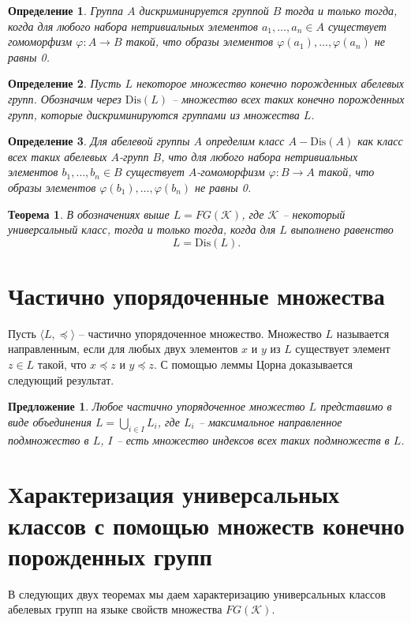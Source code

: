 \documentclass[12pt]{extarticle} %
\newtheorem{theorem}{Теорема}[section]
\newtheorem{proposition}{Предложение}[section]
\newtheorem{definition}{Определение}[section]
\def\K{{\mathcal{K}}}
\def\Dis{{\mathrm{Dis}}}
\begin{document}
\begin{definition}
Группа $A$ дискриминируется группой $B$ тогда и только тогда, когда для любого набора нетривиальных элементов $a_1, \ldots, a_n \in A$ существует гомоморфизм $\varphi : A \rightarrow B$ такой, что образы элементов $\varphi(a_1), \ldots, \varphi(a_n)$ не равны 0.
\end{definition}

\begin{definition}
Пусть $L$ некоторое множество конечно порожденных абелевых групп. Обозначим через $\Dis(L)$ -- множество всех таких конечно порожденных групп, которые дискриминируются группами из множества $L$.
\end{definition}

\begin{definition}
Для абелевой группы $A$ определим класс $A-\Dis(A)$ как класс всех таких абелевых $A$-групп $B$, что для любого набора нетривиальных элементов $b_1, \ldots, b_n \in B$ существует $A$-гомоморфизм $\varphi: B \rightarrow A$ такой, что образы элементов $\varphi(b_1), \ldots, \varphi(b_n)$ не равны 0.
\end{definition}


\begin{theorem}\label{th:LDisL}
В обозначениях выше $L = FG(\K)$, где $\K$ -- некоторый универсальный класс, тогда и только тогда, когда для $L$ выполнено равенство $$L = \Dis(L).$$
\end{theorem}


\section{Частично упорядоченные множества} 
Пусть $\langle L, \preceq \rangle$ -- частично упорядоченное множество. Множество $L$ называется направленным, если для любых двух элементов $x$ и $y$ из $L$ существует элемент $z \in L$ такой, что $x \preceq z$ и $y \preceq z$. С помощью леммы Цорна доказывается следующий результат.
\begin{proposition}\label{prop:LIsUnion}
Любое частично упорядоченное множество $L$ представимо в виде объединения $L = \bigcup\limits_{i \in I} L_i$, где $L_i$ -- максимальное направленное подмножество в $L$, $I$ -- есть множество индексов всех таких подмножеств в $L$.
\end{proposition}


\section{Характеризация универсальных классов с помощью множеств конечно порожденных групп} 
В следующих двух теоремах мы даем характеризацию универсальных классов абелевых групп на языке свойств множества $FG(\K)$.
\end{document}
